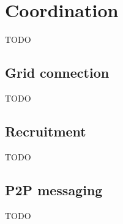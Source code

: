 \section{Coordination}
TODO

\subsection{Grid connection}
TODO

\subsection{Recruitment}
TODO

\subsection{P2P messaging}
TODO